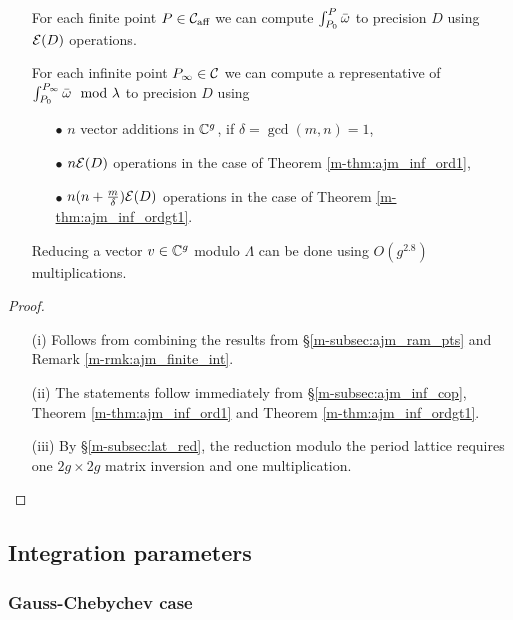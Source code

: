 \documentclass[main.tex]{subfiles}
\begin{document}
   \begin{thm} \
   \begin{itemize}
     \item[{\upshape{(i)}}] For each finite point $P \in \mathcal{C}_{\text{aff}}$ we can compute $\int_{P_0}^P \bar{\omega}$ to precision $D$ using
      $\mathcal E(D)$ operations.
     \item[{\upshape{(ii)}}] For each infinite point $P_{\infty} \in \mathcal{C}$ we can compute a representative of $\int_{P_0}^{P_{\infty}} \bar{\omega} \mod \lambda$ to precision $D$ using
      \begin{itemize}
       \item[$\bullet$] $n$ vector additions in $\mathbb{C}^g$, if $\delta = \gcd(m,n) = 1$,
       \item[$\bullet$] $n \mathcal E(D)$ operations in the case of Theorem \ref{m-thm:ajm_inf_ord1},
       \item[$\bullet$] $n(n+\frac{m}\delta)\mathcal E(D)$ operations  in the case of Theorem \ref{m-thm:ajm_inf_ordgt1}.
      \end{itemize}
      \item[{\upshape{(iii)}}] Reducing a vector $v \in \mathbb{C}^g$ modulo $\Lambda$ can be done using $O(g^{2.8})$ multiplications.
    \end{itemize}
  \end{thm}
   \begin{proof}
    \begin{itemize}
     \item[(i)] Follows from combining the results from \S \ref{m-subsec:ajm_ram_pts} and Remark \ref{m-rmk:ajm_finite_int}.
     \item[(ii)] The statements follow immediately from \S \ref{m-subsec:ajm_inf_cop}, Theorem \ref{m-thm:ajm_inf_ord1} and Theorem \ref{m-thm:ajm_inf_ordgt1}.
     \item[(iii)] By \S \ref{m-subsec:lat_red}, the reduction modulo the period lattice requires one $2g \times 2g$ matrix inversion and one multiplication.
    \end{itemize}
   \end{proof}

   \subsection{Integration parameters}

   \subsubsection{Gauss-Chebychev case}
\end{document}
